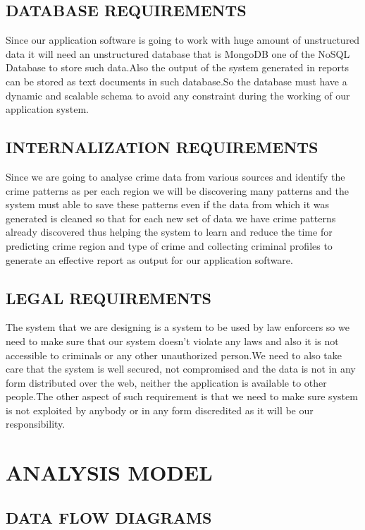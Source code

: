 \documentclass[12pt]{extreport}
\begin{document}
    \subsection{DATABASE REQUIREMENTS}
\hspace*{5em}Since our application software is going to work with huge amount of unstructured data it will need an unstructured database that is MongoDB one of the NoSQL Database to store such data.Also the output of the system generated in reports can be stored as text documents in such database.So the database must have a dynamic and scalable schema to avoid any constraint during the working of our application system.
    \subsection{INTERNALIZATION REQUIREMENTS}
\hspace*{5em}Since we are going to analyse crime data from various sources and identify the crime patterns as per each region  we will be discovering many patterns and the system must able to save these patterns even if the data from which it was generated is cleaned so that for each new set of data we have crime patterns already discovered thus helping the system to learn and reduce the time for predicting crime region and type of crime and collecting criminal profiles to generate an effective report as output for our application software.
    \subsection{LEGAL REQUIREMENTS}
\hspace*{5em}The system that we are designing is a system to be used by law enforcers so we need to make sure that our system doesn't violate any laws and also it is not accessible to  criminals or any other  unauthorized person.We need to also take care that the system is well secured, not compromised and the data is not in any form distributed over the web, neither the application is available to other people.The other aspect of such requirement is that we need to make sure system is not exploited by anybody or in any form discredited as it will be our responsibility.
    

\section{ANALYSIS MODEL}

     \subsection{DATA FLOW DIAGRAMS}
     
\end{document}
